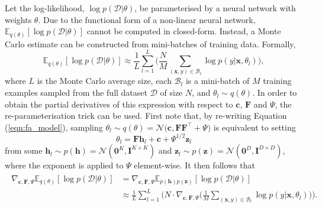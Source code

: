 \documentclass[msc,deptreport.inf]{infthesis} %
\newcommand{\matr}[1]{\mathbf{#1}}
\newcommand{\E}{\mathbb E}
\begin{document}
Let the log-likelihood, $\log p(\mathcal{D} | \theta)$, be parameterised by a neural network with weights $\theta$. Due to the functional form of a non-linear neural network, $\E_{q(\theta)} [\log p(\mathcal{D} | \theta)]$ cannot be computed in closed-form. Instead, a Monte Carlo estimate can be constructed from mini-batches of training data. Formally, 
\begin{equation}
	 \E_{q(\theta)} [\log p(\mathcal{D} | \theta)]
	\approx \frac{1}{L} \sum_{l=1}^{L} \Bigg( \frac{N}{M} \sum_{(\matr{x}, y) \in \mathcal{B}_l} \log p(y | \matr{x}, \theta_l) \Bigg),
\end{equation}
where $L$ is the Monte Carlo average size, each $\mathcal{B}_l$ is a mini-batch of $M$ training examples sampled from the full dataset $\mathcal{D}$ of size $N$, and $\theta_l \sim q(\theta)$. In order to obtain the partial derivatives of this expression with respect to $\matr{c}$, $\matr{F}$ and $\Psi$, the re-parameterisation trick \cite{goodfellow2016} can be used. First note that, by re-writing Equation (\ref{eqn:fa_model}), sampling $\theta_l \sim q(\theta) = \mathcal{N}\big(\matr{c}, \matr{FF}^{\intercal} + \Psi\big)$ is equivalent to setting  
\begin{equation}\label{eqn:fa_reparam_trick}
	\theta_l = \matr{F}\matr{h}_l + \matr{c} + \Psi^{1/2} \matr{z}_l
\end{equation}
from some $\matr{h}_l \sim p(\matr{h}) = \mathcal{N}(\matr{0}^K, \matr{I}^{K \times K})$ and $\matr{z}_l \sim p(\matr{z}) = \mathcal{N}(\matr{0}^D, \matr{I}^{D \times D})$, where the exponent is applied to $\Psi$ element-wise. 
It then follows that
\begin{align}
\begin{split}\label{eqn:expected_grad_log_likelihood}
	\nabla_{\matr{c}, \matr{F}, \Psi} \E_{q(\theta)} [\log p(\mathcal{D} | \theta)]
	& = \nabla_{\matr{c}, \matr{F}, \Psi} \E_{p(\matr{h})p(\matr{z})} [\log p(\mathcal{D} | \theta)] \\
	& \approx \frac{1}{L} \sum_{l=1}^{L} \Bigg(N \cdot \nabla_{\matr{c}, \matr{F}, \Psi} \Bigg( \frac{1}{M} \sum_{(\matr{x}, y) \in \mathcal{B}_l} \log p(y | \matr{x}, \theta_l) \Bigg) \Bigg).
\end{split}
\end{align}
\end{document}
